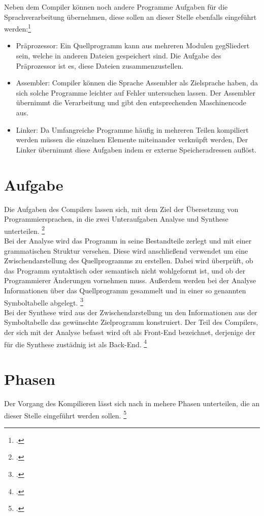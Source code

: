 Neben dem Compiler können noch andere Programme Aufgaben für die Sprachverarbeitung übernehmen, diese sollen an dieser Stelle ebenfalls eingeführt werden:\footcite[Vgl.][S. 4f]{Ullmann2008} \\\begin{itemize}
\setlength\itemsep{-1.5em}
\item Präprozessor: Ein Quellprogramm kann aus mehreren Modulen gegSliedert sein, welche in anderen Dateien gespeichert sind. Die Aufgabe des Präprozessor ist es, diese Dateien zusammenzustellen. 
\item Assembler: Compiler können die Sprache Assembler als Zielsprache haben, da sich solche Programme leichter auf Fehler untersuchen lassen. Der Assembler übernimmt die Verarbeitung und gibt den entsprechenden Maschinencode aus.
\item Linker: Da Umfangreiche Programme häufig in mehreren Teilen kompiliert werden müssen die einzelnen Elemente miteinander verknüpft werden, Der Linker übernimmt diese Aufgaben indem er externe Speicheradressen auflöst.
\end{itemize}



\section{Aufgabe}
Die Aufgaben des Compilers lassen sich, mit dem Ziel der Übersetzung von Programmiersprachen, in die zwei Unteraufgaben Analyse und Synthese unterteilen. \footcite[Vgl.][S. 6]{Ullmann2008}\\
Bei der Analyse wird das Programm in seine Bestandteile zerlegt und mit einer grammatischen Struktur versehen. Diese wird anschließend verwendet um eine Zwischendarstellung des Quellprogramms zu erstellen. Dabei wird überprüft, ob das Programm syntaktisch oder semantisch nicht wohlgeformt ist, und ob der Programmierer Änderungen vornehmen muss. Außerdem werden bei der Analyse Informationen über das Quellprogramm gesammelt und in einer so genannten Symboltabelle abgelegt.  \footcite[Vgl.][S. 6f]{Ullmann2008}\\
Bei der Synthese wird aus der Zwischendarstellung un den Informationen aus der Symboltabelle das gewünschte Zielprogramm konstruiert. Der Teil des Compilers, der sich mit der Analyse befasst wird oft als Front-End bezeichnet, derjenige der für die Synthese zustädnig ist als Back-End.  \footcite[Vgl.][S. 7]{Ullmann2008}
\section{Phasen}
Der Vorgang des Kompilieren lässt sich nach \citeauthor{Ullmann2008} in mehere Phasen unterteilen, die an dieser Stelle eingeführt werden sollen. \footcite[Vgl.][S. 6]{Ullmann2008}
